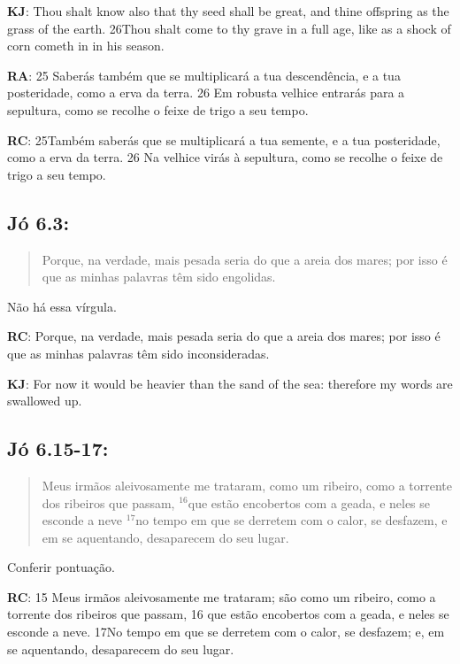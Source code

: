 \textbf{KJ}: Thou shalt know also that thy seed shall be great, and thine offspring as the grass of the earth. 26Thou shalt come to thy grave in a full age, like as a shock of corn cometh in in his season.

\textbf{RA}: 25 Saberás também que se multiplicará a tua descendência, e a tua posteridade, como a erva da terra. 26 Em robusta velhice entrarás para a sepultura, como se recolhe o feixe de trigo a seu tempo.

\textbf{RC}: 25Também saberás que se multiplicará a tua semente, e a tua posteridade, como a erva da terra. 26 Na velhice virás à sepultura, como se recolhe o feixe de trigo a seu tempo.

\subsection*{Jó 6.3:} 
 \begin{quote}
    \small
 Porque, na verdade, mais pesada seria\uwave{,} do que a areia dos mares; por isso é que as minhas palavras têm sido engolidas.
\end{quote}

Não há essa vírgula.

\textbf{RC}: Porque, na verdade, mais pesada seria do que a areia dos mares; por isso é que as minhas palavras têm sido inconsideradas.

\textbf{KJ}: For now it would be heavier than the sand of the sea: therefore my words are swallowed up.

\subsection*{Jó 6.15-17:} 
 \begin{quote}
    \small
Meus irmãos aleivosamente me trataram, como um ribeiro, como a torrente dos ribeiros que passam, $^{\mathrm{16}}$que estão encobertos com a geada, e neles se esconde a neve\uwave{,} $^{\mathrm{17}}$no tempo em que se derretem com o calor, se desfazem, e em se aquentando, desaparecem do seu lugar.
\end{quote}

Conferir pontuação.

\textbf{RC}: 15 Meus irmãos aleivosamente me trataram; são como um ribeiro, como a torrente dos ribeiros que passam, 16 que estão encobertos com a geada, e neles se esconde a neve. 17No tempo em que se derretem com o calor, se desfazem; e, em se aquentando, desaparecem do seu lugar.

